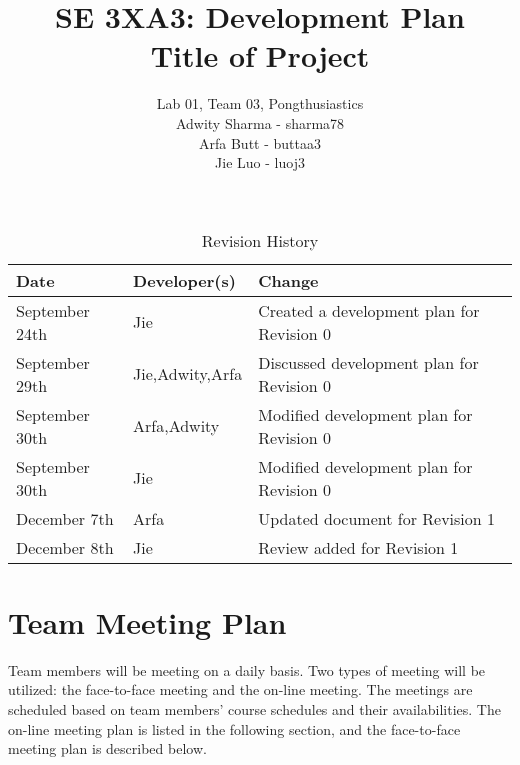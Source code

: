 \documentclass{article}
\title{SE 3XA3: Development Plan\\Title of Project}
\author{Lab 01, Team 03, Pongthusiastics 		
\\ Adwity Sharma - sharma78 		
\\ Arfa Butt - buttaa3 	
	\\ Jie Luo - luoj3 }
\date{}
\begin{document}
 
\begin{table}[hp]
 \caption{Revision History} \label{TblRevisionHistory} 
\begin{tabularx}{\textwidth}{llX} 
\toprule
 \textbf{Date} & \textbf{Developer(s)} & \textbf{Change}\\ 
\midrule 
September 24th & Jie  & Created a development plan for Revision 0\\ 
September 29th & Jie,Adwity,Arfa & Discussed development plan for Revision 0\\ 
September 30th & Arfa,Adwity & Modified development plan for Revision 0\\ 
September 30th & Jie  & Modified development plan for Revision 0\\ 
December 7th & Arfa & Updated document for Revision 1\\
December 8th & Jie & Review added for Revision 1\\
\bottomrule
 \end{tabularx} 
\end{table} 
\newpage 
\maketitle


\section {Team Meeting Plan} 

Team members will be meeting on a daily basis. Two types of meeting will be utilized: the face-to-face meeting and the on-line meeting. The meetings are scheduled based on team members' course schedules and their availabilities. The on-line meeting plan is listed in the following section, and the face-to-face meeting plan is described below.\\
\end{document}
